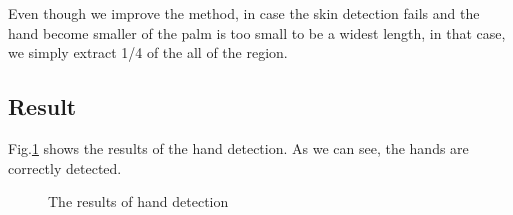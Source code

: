 Even though we improve the method, in case the skin detection fails and the hand become smaller of the palm is too small to be a widest length, in that case, we simply extract 1/4 of the all of the region.
\subsection{Result}
Fig.\ref{fig:hands} shows the results of the hand detection.
As we can see, the hands are correctly detected.

\begin{landscape}
\begin{figure}[htbp]
 \centering
 
 \caption{The results of hand detection}
 \label{fig:hands}
\end{figure}
\end{landscape}
